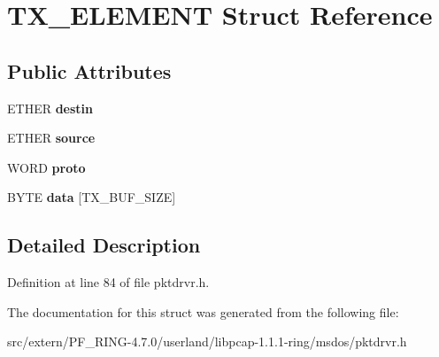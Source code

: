 \hypertarget{struct_t_x___e_l_e_m_e_n_t}{
\section{TX\_\-ELEMENT Struct Reference}
\label{struct_t_x___e_l_e_m_e_n_t}
}
\subsection*{Public Attributes}
\begin{DoxyCompactItemize}
\item 
\hypertarget{struct_t_x___e_l_e_m_e_n_t_aa22e5ac89915789d70ab987e7526b859}{
ETHER {\bfseries destin}}
\label{struct_t_x___e_l_e_m_e_n_t_aa22e5ac89915789d70ab987e7526b859}

\item 
\hypertarget{struct_t_x___e_l_e_m_e_n_t_adf356f6667d3f358ccae54a6751da3a2}{
ETHER {\bfseries source}}
\label{struct_t_x___e_l_e_m_e_n_t_adf356f6667d3f358ccae54a6751da3a2}

\item 
\hypertarget{struct_t_x___e_l_e_m_e_n_t_a38d6cd738223a295220f72b0c11af11b}{
WORD {\bfseries proto}}
\label{struct_t_x___e_l_e_m_e_n_t_a38d6cd738223a295220f72b0c11af11b}

\item 
\hypertarget{struct_t_x___e_l_e_m_e_n_t_a6a41d2b43e33acbd9d6e419ba23d6dac}{
BYTE {\bfseries data} \mbox{[}TX\_\-BUF\_\-SIZE\mbox{]}}
\label{struct_t_x___e_l_e_m_e_n_t_a6a41d2b43e33acbd9d6e419ba23d6dac}

\end{DoxyCompactItemize}


\subsection{Detailed Description}


Definition at line 84 of file pktdrvr.h.



The documentation for this struct was generated from the following file:\begin{DoxyCompactItemize}
\item 
src/extern/PF\_\-RING-\/4.7.0/userland/libpcap-\/1.1.1-\/ring/msdos/pktdrvr.h\end{DoxyCompactItemize}
